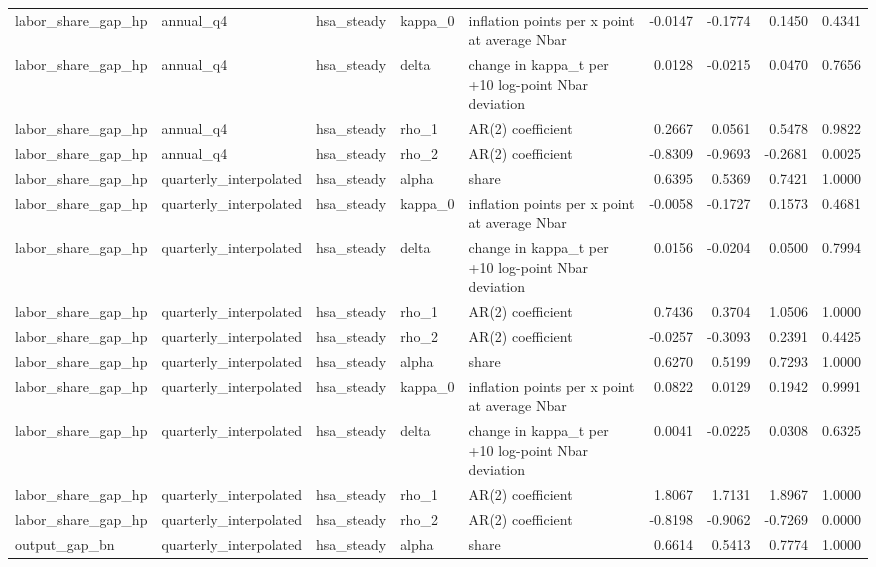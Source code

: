 \begin{tabular}{lllllrrrr}
labor\_share\_gap\_hp & annual\_q4 & hsa\_steady & kappa\_0 & inflation points per x point at average Nbar & -0.0147 & -0.1774 & 0.1450 & 0.4341 \\
labor\_share\_gap\_hp & annual\_q4 & hsa\_steady & delta & change in kappa\_t per +10 log-point Nbar deviation & 0.0128 & -0.0215 & 0.0470 & 0.7656 \\
labor\_share\_gap\_hp & annual\_q4 & hsa\_steady & rho\_1 & AR(2) coefficient & 0.2667 & 0.0561 & 0.5478 & 0.9822 \\
labor\_share\_gap\_hp & annual\_q4 & hsa\_steady & rho\_2 & AR(2) coefficient & -0.8309 & -0.9693 & -0.2681 & 0.0025 \\
labor\_share\_gap\_hp & quarterly\_interpolated & hsa\_steady & alpha & share & 0.6395 & 0.5369 & 0.7421 & 1.0000 \\
labor\_share\_gap\_hp & quarterly\_interpolated & hsa\_steady & kappa\_0 & inflation points per x point at average Nbar & -0.0058 & -0.1727 & 0.1573 & 0.4681 \\
labor\_share\_gap\_hp & quarterly\_interpolated & hsa\_steady & delta & change in kappa\_t per +10 log-point Nbar deviation & 0.0156 & -0.0204 & 0.0500 & 0.7994 \\
labor\_share\_gap\_hp & quarterly\_interpolated & hsa\_steady & rho\_1 & AR(2) coefficient & 0.7436 & 0.3704 & 1.0506 & 1.0000 \\
labor\_share\_gap\_hp & quarterly\_interpolated & hsa\_steady & rho\_2 & AR(2) coefficient & -0.0257 & -0.3093 & 0.2391 & 0.4425 \\
labor\_share\_gap\_hp & quarterly\_interpolated & hsa\_steady & alpha & share & 0.6270 & 0.5199 & 0.7293 & 1.0000 \\
labor\_share\_gap\_hp & quarterly\_interpolated & hsa\_steady & kappa\_0 & inflation points per x point at average Nbar & 0.0822 & 0.0129 & 0.1942 & 0.9991 \\
labor\_share\_gap\_hp & quarterly\_interpolated & hsa\_steady & delta & change in kappa\_t per +10 log-point Nbar deviation & 0.0041 & -0.0225 & 0.0308 & 0.6325 \\
labor\_share\_gap\_hp & quarterly\_interpolated & hsa\_steady & rho\_1 & AR(2) coefficient & 1.8067 & 1.7131 & 1.8967 & 1.0000 \\
labor\_share\_gap\_hp & quarterly\_interpolated & hsa\_steady & rho\_2 & AR(2) coefficient & -0.8198 & -0.9062 & -0.7269 & 0.0000 \\
output\_gap\_bn & quarterly\_interpolated & hsa\_steady & alpha & share & 0.6614 & 0.5413 & 0.7774 & 1.0000 \\

\end{tabular}
